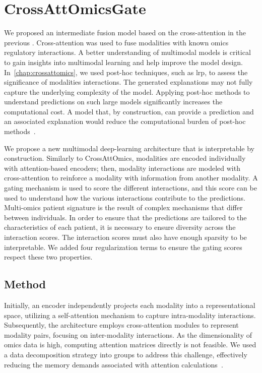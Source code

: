 \documentclass[../main.tex]{subfiles}
\begin{document}
\chapter{CrossAttOmicsGate}\label{chap:crossattomicsgate}
\minitocpage

We proposed an intermediate fusion model based on the cross-attention in the previous .
Cross-attention was used to fuse modalities with known omics regulatory interactions.
A better understanding of multimodal models is critical to gain insights into multimodal learning and help improve the model design.
In~\cref{chap:crossattomics}, we used post-hoc techniques, such as \gls{lrp}, to assess the significance of modalities interactions.
The generated explanations may not fully capture the underlying complexity of the model.
Applying post-hoc methods to understand predictions on such large models significantly increases the computational cost.
A model that, by construction, can provide a prediction and an associated explanation would reduce the computational burden of post-hoc methods~\cite{Rudin2019}.

We propose a new multimodal deep-learning architecture that is interpretable by construction.
Similarly to CrossAttOmics, modalities are encoded individually with attention-based encoders; then, modality interactions are modeled with cross-attention to reinforce a modality with information from another modality.
A gating mechanism is used to score the different interactions, and this score can be used to understand how the various interactions contribute to the predictions.
Multi-omics patient signature is the result of complex mechanisms that differ between individuals.
In order to ensure that the predictions are tailored to the characteristics of each patient, it is necessary to ensure diversity across the interaction scores.
The interaction scores must also have enough sparsity to be interpretable.
We added four regularization terms to ensure the gating scores respect these two properties.

\section{Method}
	Initially, an encoder independently projects each modality into a representational space, utilizing a self-attention mechanism to capture intra-modality interactions.
	Subsequently, the architecture employs cross-attention modules to represent modality pairs, focusing on inter-modality interactions.
	As the dimensionality of omics data is high, computing attention matrices directly is not feasible.
	We used a data decomposition strategy into groups to address this challenge, effectively reducing the memory demands associated with attention calculations~\cite{AttOmics}.
\end{document}
